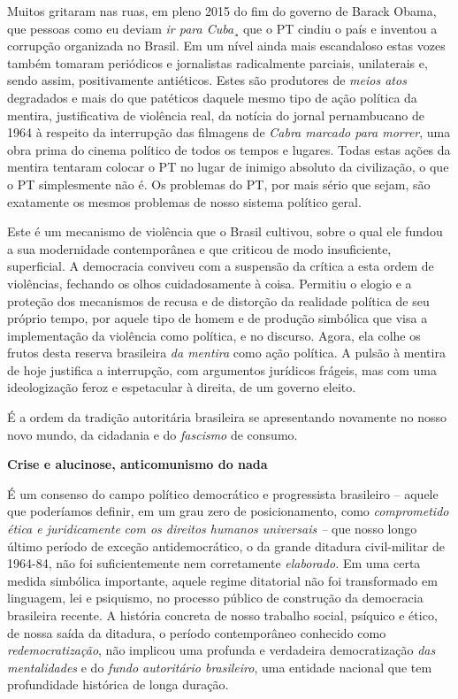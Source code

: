 Muitos gritaram nas ruas, em pleno 2015 do fim do governo de Barack
Obama, que pessoas como eu deviam \emph{ir para Cuba}¸ que o PT cindiu o
país e inventou a corrupção organizada no Brasil. Em um nível ainda mais
escandaloso estas vozes também tomaram periódicos e jornalistas
radicalmente parciais, unilaterais e, sendo assim, positivamente
antiéticos. Estes são produtores de \emph{meios atos} degradados e mais
do que patéticos daquele mesmo tipo de ação política da mentira,
justificativa de violência real, da notícia do jornal pernambucano de
1964 à respeito da interrupção das filmagens de \emph{Cabra marcado para
morrer}, uma obra prima do cinema político de todos os tempos e lugares.
Todas estas ações da mentira tentaram colocar o PT no lugar de inimigo
absoluto da civilização, o que o PT simplesmente não é. Os problemas do
PT, por mais sério que sejam, são exatamente os mesmos problemas de
nosso sistema político geral.

Este é um mecanismo de violência que o Brasil cultivou, sobre o qual ele
fundou a sua modernidade contemporânea e que criticou de modo
insuficiente, superficial. A democracia conviveu com a suspensão da
crítica a esta ordem de violências, fechando os olhos cuidadosamente à
coisa. Permitiu o elogio e a proteção dos mecanismos de recusa e de
distorção da realidade política de seu próprio tempo, por aquele tipo de
homem e de produção simbólica que visa a implementação da violência como
política, e no discurso. Agora, ela colhe os frutos desta reserva
brasileira \emph{da mentira} como ação política. A pulsão à mentira de
hoje justifica a interrupção, com argumentos jurídicos frágeis, mas com
uma ideologização feroz e espetacular à direita, de um governo eleito.

É a ordem da tradição autoritária brasileira se apresentando novamente
no nosso novo mundo, da cidadania e do \emph{fascismo} de consumo.

\textbf{Crise e alucinose, anticomunismo do nada}

É um consenso do campo político democrático e progressista brasileiro --
aquele que poderíamos definir, em um grau zero de posicionamento, como
\emph{comprometido} \emph{ética e juridicamente} \emph{com os direitos
humanos universais --} que nosso longo último período de exceção
antidemocrático, o da grande ditadura civil-militar de 1964-84, não foi
suficientemente nem corretamente \emph{elaborado.} Em uma certa medida
simbólica importante, aquele regime ditatorial não foi transformado em
linguagem, lei e psiquismo, no processo público de construção da
democracia brasileira recente. A história concreta de nosso trabalho
social, psíquico e ético, de nossa saída da ditadura, o período
contemporâneo conhecido como \emph{redemocratização}, não implicou uma
profunda e verdadeira democratização \emph{das mentalidades} e do
\emph{fundo autoritário brasileiro}, uma entidade nacional que tem
profundidade histórica de longa duração.

